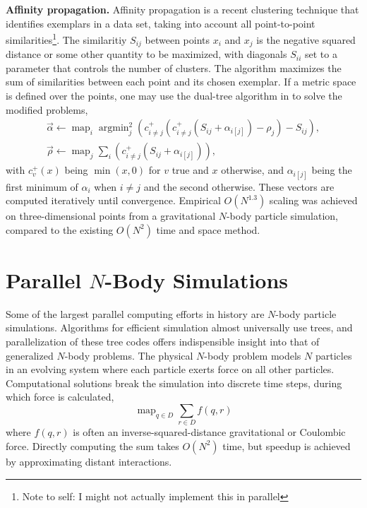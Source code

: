 \documentclass[times, leqno,twocolumn]{article}
\newcommand{\authornote}[1]{\footnote{Note to self: #1}}
\newcommand{\authorsnote}[1]{\authornote{#1}}
\DeclareMathOperator*{\map}{map}
\DeclareMathOperator*{\argmin}{argmin}
\newcommand{\ocpos}[1]{c^{+}_{#1}}
\newcommand{\cpos}[2]{\ocpos{#1 \neq #2}}
\newcommand{\simil}[2]{S_{#1#2}}
\newcommand{\vecrho}{\vec{\rho}}
\newcommand{\vecalpha}{\vec{\alpha}}
\newcommand{\frho}[1]{\rho_{#1}}
\newcommand{\falpha}[1]{\alpha_{#1}}
\newcommand{\falphaj}[2]{\alpha_{#1[#2]}}
\begin{document}
{\bf Affinity propagation.}
Affinity propagation is a recent clustering technique that identifies exemplars in a data set, taking into account all point-to-point similarities\cite{affinity}\authorsnote{I might not actually implement this in parallel}.
The similaritiy $\simil{i}{j}$ between points $x_i$ and $x_j$ is the negative squared distance or some other quantity to be maximized, with diagonals $\simil{i}{i}$ set to a parameter that controls the number of clusters.
The algorithm maximizes the sum of similarities between each point and its chosen exemplar.
If a metric space is defined over the points, one may use the dual-tree algorithm in \cite{ryan_nips} to solve the modified problems,
\[ \begin{array}{l}
  \vecalpha \gets \map_{i} \argmin^2_{j} \!\left( \cpos{i}{j}(\cpos{i}{j}(\simil{i}{j} + \falphaj{i}{j}) - \frho{j}) - \simil{i}{j} \right)\! ,
  \\
  \vecrho \gets \map_{j} \sum_{i} \!\left( \cpos{i}{j}(\simil{i}{j} + \falphaj{i}{j}) \right)\!,
\end{array} \]
\noindent with $\ocpos{v}(x)$ being $\min(x, 0)$ for $v$ true and $x$ otherwise, and $\falphaj{i}{j}$ being the first minimum of $\falpha{i}$ when $i \neq j$ and the second otherwise.
These vectors are computed iteratively until convergence.
Empirical $O(N^{1.3})$ scaling was achieved on three-dimensional points from a gravitational $N$-body particle simulation, compared to the existing $O(N^2)$ time and space method.

\section{Parallel $N$-Body Simulations}

Some of the largest parallel computing efforts in history are $N$-body particle simulations.
Algorithms for efficient simulation almost universally use trees, and parallelization of these tree codes offers indispensible insight into that of generalized $N$-body problems.
The physical $N$-body problem models $N$ particles in an evolving system where each particle exerts force on all other particles.
Computational solutions break the simulation into discrete time steps, during which force is calculated,
\[\map_{q \in D} \sum_{r \in D} f(q,r)\]
\noindent where $f(q,r)$ is often an inverse-squared-distance gravitational or Coulombic force.
Directly computing the sum takes $O(N^2)$ time, but speedup is achieved by approximating distant interactions.
\end{document}

